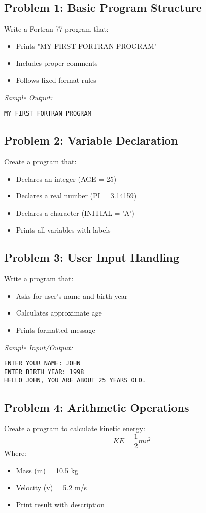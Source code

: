 \documentclass{book}
\begin{document}
\subsection*{Problem 1: Basic Program Structure}
Write a Fortran 77 program that:
\begin{itemize}
    \item Prints "MY FIRST FORTRAN PROGRAM"
    \item Includes proper comments
    \item Follows fixed-format rules
\end{itemize}
\textit{Sample Output:}
\begin{verbatim}
MY FIRST FORTRAN PROGRAM
\end{verbatim}

\subsection*{Problem 2: Variable Declaration}
Create a program that:
\begin{itemize}
    \item Declares an integer (AGE = 25)
    \item Declares a real number (PI = 3.14159)
    \item Declares a character (INITIAL = 'A')
    \item Prints all variables with labels
\end{itemize}

\subsection*{Problem 3: User Input Handling}
Write a program that:
\begin{itemize}
    \item Asks for user's name and birth year
    \item Calculates approximate age
    \item Prints formatted message
\end{itemize}
\textit{Sample Input/Output:}
\begin{verbatim}
ENTER YOUR NAME: JOHN
ENTER BIRTH YEAR: 1998
HELLO JOHN, YOU ARE ABOUT 25 YEARS OLD.
\end{verbatim}

\subsection*{Problem 4: Arithmetic Operations}
Create a program to calculate kinetic energy:
\[ KE = \frac{1}{2}mv^2 \]
Where:
\begin{itemize}
    \item Mass (m) = 10.5 kg
    \item Velocity (v) = 5.2 m/s
    \item Print result with description
\end{itemize}
\end{document}

